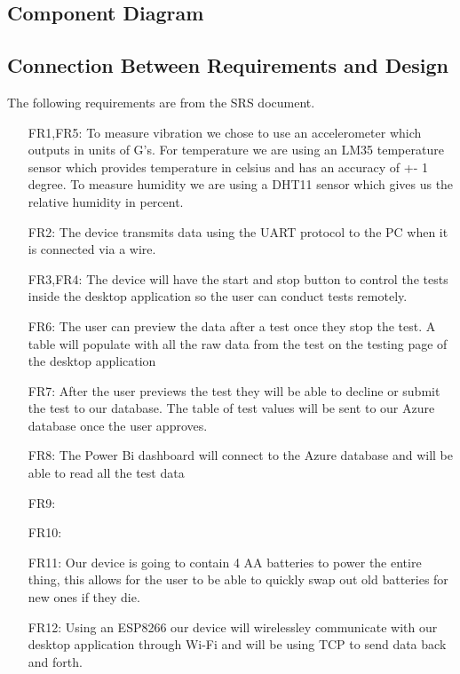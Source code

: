 \documentclass[12pt, titlepage]{article}
\begin{document}

\subsection{Component Diagram}

\subsection{Connection Between Requirements and Design} \label{SecConnection}
The following requirements are from the SRS document.

\begin{itemize}
  \item[FR1,FR5:] To measure vibration we chose to use an accelerometer which outputs in units of G's. For temperature we are using an LM35 temperature sensor which provides temperature in celsius and has an accuracy of +- 1 degree. To measure humidity we are using a DHT11 sensor which gives us the relative humidity in percent.
  \item[FR2:] The device transmits data using the UART protocol to the PC when it is connected via a wire.
  \item[FR3,FR4:] The device will have the start and stop button to control the tests inside the desktop application so the user can conduct tests remotely.
  \item[FR6:] The user can preview the data after a test once they stop the test. A table will populate with all the raw data from the test on the testing page of the desktop application
  \item[FR7:] After the user previews the test they will be able to decline or submit the test to our database. The table of test values will be sent to our Azure database once the user approves.
  \item[FR8:] The Power Bi dashboard will connect to the Azure database and will be able to read all the test data
  \item[FR9:]
  \item[FR10:]
  \item[FR11:] Our device is going to contain 4 AA batteries to power the entire thing, this allows for the user to be able to quickly swap out old batteries for new ones if they die.
  \item[FR12:] Using an ESP8266 our device will wirelessley communicate with our desktop application through Wi-Fi and will be using TCP to send data back and forth.
  \item[]        
  
\end{itemize}
\end{document}
